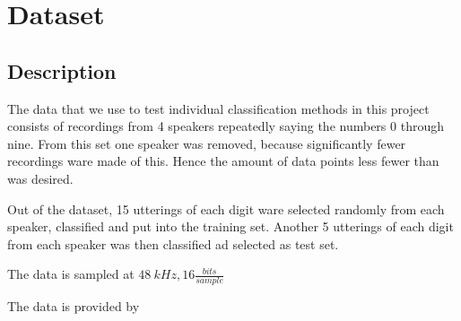 \chapter{Dataset}
\section{Description}
The data that we use to test individual classification methods in this project consists of recordings from 4 speakers repeatedly saying the numbers 0 through nine.
From this set one speaker was removed, because significantly fewer recordings ware made of this.
Hence the amount of data points less fewer than was desired.

Out of the dataset, 15 utterings of each digit ware selected randomly from each speaker, classified and put into the training set.
Another 5 utterings of each digit from each speaker was then classified ad selected as test set.

The data is sampled at $ 48\ kHz, 16\frac{bits}{sample}  $

The data is provided by 

